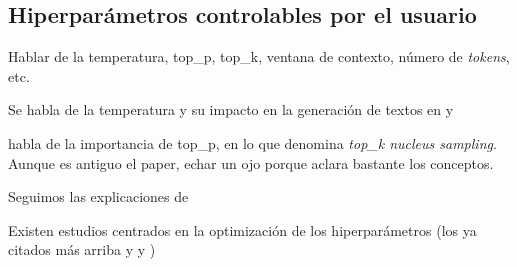 \subsection{Hiperparámetros controlables por el usuario}
\label{sec:hiperparametros_controlables}
Hablar de la temperatura, top\_p, top\_k, ventana de contexto, número de \emph{tokens}, etc. 

Se habla de la temperatura y su impacto en la generación de textos en \cite{holtzmanCuriousCaseNeural2020} y \cite{chamandFinetuneYourClassifier2022}

\cite{holtzmanCuriousCaseNeural2020} habla de la importancia de top\_p, en lo que denomina \emph{top\_k nucleus sampling}. Aunque es antiguo el paper, echar un ojo porque aclara bastante los conceptos.

Seguimos las explicaciones de \cite{rothmanTransformersNaturalLanguage2021}

Existen estudios centrados en la optimización de los hiperparámetros (los ya citados más arriba y \cite{wangCostEffectiveHyperparameterOptimization2023} y \cite{wangHyperparameterOptimizationAlgorithm2022})

